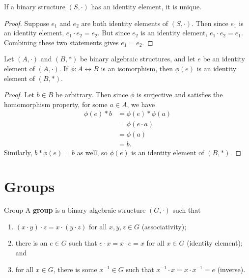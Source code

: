 \documentclass[10pt]{report}
\begin{document}
\begin{prop}
	If a binary structure $(S, \cdot)$ has an identity element, it is unique.
\end{prop}
\begin{proof}
	Suppose $e_1$ and $e_2$ are both identity elements of $(S, \cdot)$. Then since $e_1$ is an identity element, $e_1 \cdot e_2 = e_2$. But since $e_2$ is an identity element, $e_1 \cdot e_2 = e_1$. Combining these two statements gives $e_1=e_2$.
\end{proof}

\begin{prop}
	Let $(A, \cdot)$ and $(B, *)$ be binary algebraic structures, and let $e$ be an identity element of $ (A, \cdot)$. If $\phi: A \leftrightarrow B$ is an isomorphism, then $\phi(e)$ is an identity element of $(B, *)$.
\end{prop}
\begin{proof}
	Let $b \in B$ be arbitrary. Then since $\phi$ is surjective and satisfies the homomorphism property, for some $a \in A$, we have
	\begin{align*}
		\phi(e) * b &= \phi(e) * \phi(a) \\
			    &= \phi(e \cdot a) \\
			    &= \phi(a) \\
			    &= b.
	\end{align*}
	Similarly, $b * \phi(e) = b$ as well, so $\phi(e)$ is an identity element of $(B, *)$.
\end{proof}


\section{Groups}


\begin{defn}{Group}{}
A \textbf{group} is a binary algebraic structure $(G, \cdot)$ such that
\begin{enumerate}
	\item $(x\cdot y) \cdot z = x \cdot (y \cdot z)$ for all $x,y,z \in G$ (associativity);
	\item there is an $e \in G$ such that $e \cdot x = x \cdot e = x$ for all $x \in G$ (identity element); and
	\item for all $x \in G$, there is some $x^{-1} \in G$ such that $x^{-1} \cdot x = x \cdot x^{-1} = e$ (inverse).
\end{enumerate}
\end{defn}
\end{document}

